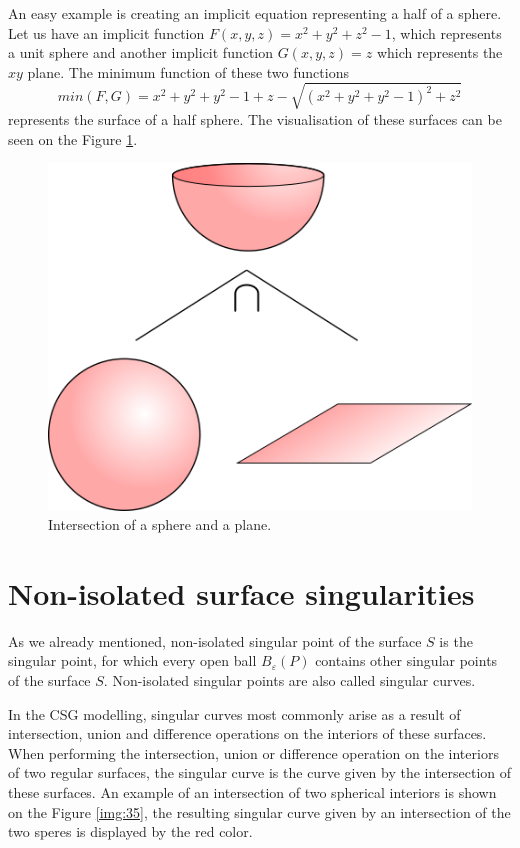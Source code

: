 An easy example is creating an implicit equation representing a half of
a sphere. Let us have an implicit function 
$F(x, y, z) = x^2+y^2+z^2-1$, which represents a unit sphere and another
implicit function $G(x, y, z) = z$ which represents the $xy$ plane.
The minimum function of these two functions
$$min(F, G) = x^2+y^2+y^2-1+z-\sqrt{(x^2+y^2+y^2-1)^2+z^2}$$ represents the
surface of a half sphere. The visualisation of these surfaces can be seen on
the Figure \ref{img:20}.
\begin{figure}
    \centerline{\includegraphics[scale=0.5]{images/img20}}
    \caption[Intersection of a sphere and a plane]
    {Intersection of a sphere and a plane.}
    \label{img:20}
\end{figure}


\section{Non-isolated surface singularities}
\label{sub2.3}

As we already mentioned, non-isolated singular point of the surface $S$ is 
the singular point, for which
every open ball $B_\varepsilon(P)$ contains other singular points of the surface $S$.
Non-isolated singular points are also called singular curves.

In the CSG modelling, singular curves most commonly arise as a result of intersection,
union and difference operations on the interiors of these surfaces. When performing
the intersection, union or difference operation on the interiors of two regular surfaces, 
the singular curve is the curve given by the intersection of these surfaces. An example
of an intersection of two spherical interiors is shown on the Figure \ref{img:35}, 
the resulting singular curve given by an intersection of the two speres is displayed
by the red color.

